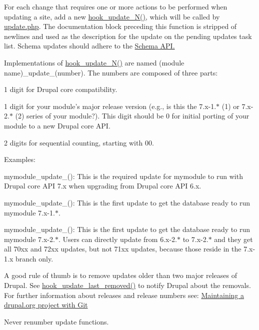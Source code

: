 For each change that requires one or more actions to be performed when updating a site, add a new \hyperlink{group__hooks_ga908950689e6b85cd0fae3b780d69a41f}{hook\_\-update\_\-N()}, which will be called by \hyperlink{update_8php}{update.php}. The documentation block preceding this function is stripped of newlines and used as the description for the update on the pending updates task list. Schema updates should adhere to the \hyperlink{}{Schema API. }

Implementations of \hyperlink{group__hooks_ga908950689e6b85cd0fae3b780d69a41f}{hook\_\-update\_\-N()} are named (module name)\_\-update\_\-(number). The numbers are composed of three parts:
\begin{DoxyItemize}
\item 1 digit for Drupal core compatibility.
\item 1 digit for your module's major release version (e.g., is this the 7.x-\/1.$\ast$ (1) or 7.x-\/2.$\ast$ (2) series of your module?). This digit should be 0 for initial porting of your module to a new Drupal core API.
\item 2 digits for sequential counting, starting with 00.
\end{DoxyItemize}

Examples:
\begin{DoxyItemize}
\item mymodule\_\-update\_(): This is the required update for mymodule to run with Drupal core API 7.x when upgrading from Drupal core API 6.x.
\item mymodule\_\-update\_(): This is the first update to get the database ready to run mymodule 7.x-\/1.$\ast$.
\item mymodule\_\-update\_(): This is the first update to get the database ready to run mymodule 7.x-\/2.$\ast$. Users can directly update from 6.x-\/2.$\ast$ to 7.x-\/2.$\ast$ and they get all 70xx and 72xx updates, but not 71xx updates, because those reside in the 7.x-\/1.x branch only.
\end{DoxyItemize}

A good rule of thumb is to remove updates older than two major releases of Drupal. See \hyperlink{group__hooks_ga2fc0f6e61d252afa19e87804dbfdb558}{hook\_\-update\_\-last\_\-removed()} to notify Drupal about the removals. For further information about releases and release numbers see: \hyperlink{}{Maintaining a drupal.org project with Git }

Never renumber update functions.

